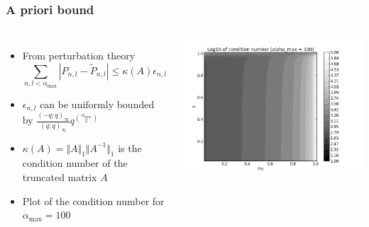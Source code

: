 \documentclass[table,aspectratio=169]{beamer}
\begin{document}
\begin{frame}[t]\frametitle{A priori bound}
    \begin{columns}
        \begin{itemize}
            \item From perturbation theory
            \[\sum_{n,l < \alpha_{\text{max}}} | P_{n,l} − \tilde{P}_{n,l} | \leq  \kappa(A) \epsilon_{n,l}\]
            \item $\epsilon_{n,l}$ can be uniformly bounded by $\frac{(-q;q)_\infty}{(q;q)_\infty}q^{\binom{\alpha_{\text{max}}}{2}}$
            \item $\kappa(A) = \Vert A \Vert_1 \Vert A^{-1} \Vert_1$ is the condition number of the truncated matrix $A$
            \item Plot of the condition number for $\alpha_{\text{max}}= 100$
        \end{itemize}
        \centering
        \includegraphics[width=.95\textwidth]{CondNo_alpha_100}
    \end{columns}
\end{frame}
\end{document}
